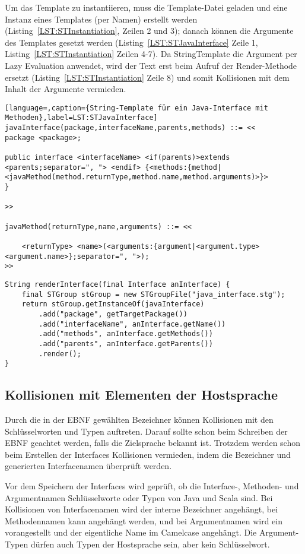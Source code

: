 \documentclass[../InterneDSLs.tex]{subfiles}
\begin{document}
Um das Template zu instantiieren, muss die Template-Datei geladen und eine Instanz eines Templates (per Namen) erstellt werden (Listing~\ref{LST:STInstantiation}, Zeilen 2 und 3); danach können die Argumente des Templates gesetzt werden (Listing~\ref{LST:STJavaInterface} Zeile 1, Listing~\ref{LST:STInstantiation} Zeilen 4-7). Da StringTemplate die Argument per Lazy Evaluation anwendet, wird der Text erst beim Aufruf der Render-Methode ersetzt (Listing~\ref{LST:STInstantiation} Zeile 8) und somit Kollisionen mit dem Inhalt der Argumente vermieden.
\begin{lstlisting}[language=,caption={String-Template für ein Java-Interface mit Methoden},label=LST:STJavaInterface]
javaInterface(package,interfaceName,parents,methods) ::= <<
package <package>;

public interface <interfaceName> <if(parents)>extends <parents;separator=", "> <endif> {<methods:{method|<javaMethod(method.returnType,method.name,method.arguments)>}>
}

>>

javaMethod(returnType,name,arguments) ::= <<

    <returnType> <name>(<arguments:{argument|<argument.type> <argument.name>};separator=", ">);
>>
\end{lstlisting}

\begin{lstlisting}[caption={Instantiierung eines String-Templates},label=LST:STInstantiation]
String renderInterface(final Interface anInterface) {
    final STGroup stGroup = new STGroupFile("java_interface.stg");
    return stGroup.getInstanceOf(javaInterface)
        .add("package", getTargetPackage())
        .add("interfaceName", anInterface.getName())
        .add("methods", anInterface.getMethods())
        .add("parents", anInterface.getParents())
        .render();
}
\end{lstlisting}

\subsection{Kollisionen mit Elementen der Hostsprache}
Durch die in der EBNF gewählten Bezeichner können Kollisionen mit den Schlüsselworten und Typen auftreten. Darauf sollte schon beim Schreiben der EBNF geachtet werden, falls die Zielsprache bekannt ist. Trotzdem werden schon beim Erstellen der Interfaces Kollisionen vermieden, indem die Bezeichner und generierten Interfacenamen überprüft werden.

Vor dem Speichern der Interfaces wird geprüft, ob die Interface-, Methoden- und Argumentnamen Schlüsselworte oder Typen von Java und Scala sind. Bei Kollisionen von Interfacenamen wird der interne Bezeichner angehängt, bei Methodennamen kann  angehängt werden, und bei Argumentnamen wird ein  vorangestellt und der eigentliche Name im Camelcase angehängt. Die Argument-Typen dürfen auch Typen der Hostsprache sein, aber kein Schlüsselwort.
\end{document}

